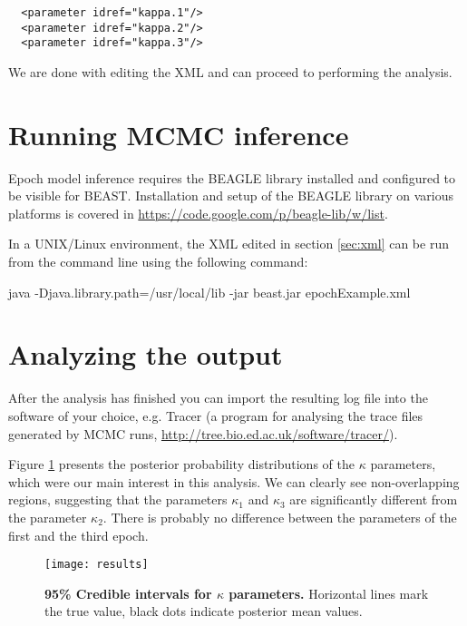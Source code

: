 \begin{lstlisting}
  <parameter idref="kappa.1"/>
  <parameter idref="kappa.2"/>
  <parameter idref="kappa.3"/>
\end{lstlisting}

We are done with editing the XML and can proceed to performing the analysis.

\section{Running MCMC inference}

Epoch model inference requires the BEAGLE library installed and configured to be visible for BEAST.
Installation and setup of the BEAGLE library on various platforms is covered in \url{https://code.google.com/p/beagle-lib/w/list}.

In a UNIX/Linux environment, the XML edited in section \ref{sec:xml} can be run from the command line using the following command:

\begin{code}
java -Djava.library.path=/usr/local/lib -jar beast.jar epochExample.xml
\end{code}


\section{Analyzing the output}

After the analysis has finished you can import the resulting log file into the software of your choice, e.g. Tracer (a program for analysing the trace files generated by MCMC runs, \url{http://tree.bio.ed.ac.uk/software/tracer/}).

Figure \ref{fig:results} presents the posterior probability distributions of the $\kappa$ parameters, which were our main interest in this analysis. 
We can clearly see non-overlapping regions, suggesting that the parameters $\kappa_1$ and $\kappa_3$ are significantly different from the parameter $\kappa_2$.
There is probably no difference between the parameters of the first and the third epoch.

\begin{figure}[h!]
\centering
\texttt{[image: results]} 
\caption{
{ \footnotesize 
{\bf 95\% Credible intervals for $\kappa$ parameters.} Horizontal lines mark the true value, black dots indicate posterior mean values.
} %
}
\label{fig:results}
\end{figure}












% 
